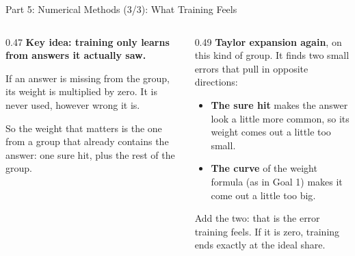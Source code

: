 \documentclass[aspectratio=169,10pt]{beamer}
\newcommand{\good}[1]{\textcolor{mGreen!60!black}{#1}}
\newcommand{\bad}[1]{\textcolor{mRed}{#1}}
\begin{document}
\begin{frame}{Part 5: Numerical Methods (3/3): What Training Feels}

\begin{columns}[T,onlytextwidth]
\begin{column}{0.47\textwidth}
\footnotesize
\textbf{Key idea: training only learns from answers it actually saw.}

\medskip
If an answer is missing from the group, its weight is multiplied by zero. It is
never used, however wrong it is.

\medskip
So the weight that matters is the one from a group that \alert{already contains
the answer}: one sure hit, plus the rest of the group.

\bigskip
\centering
{}
\end{column}

\begin{column}{0.49\textwidth}
\footnotesize
\textbf{Taylor expansion again}, on this kind of group. It finds two small errors
that pull in \alert{opposite directions}:

\medskip
\centering
{}

\raggedright
\begin{itemize}\setlength\itemsep{3pt}
  \item \textbf{The sure hit} makes the answer look a little more common, so its
        weight comes out a little \bad{too small}.
  \item \textbf{The curve} of the weight formula (as in Goal 1) makes it come out
        a little \good{too big}.
\end{itemize}
Add the two: that is the error training feels. If it is zero, training ends
exactly at the ideal share.


\end{column}
\end{columns}
\end{frame}
\end{document}
